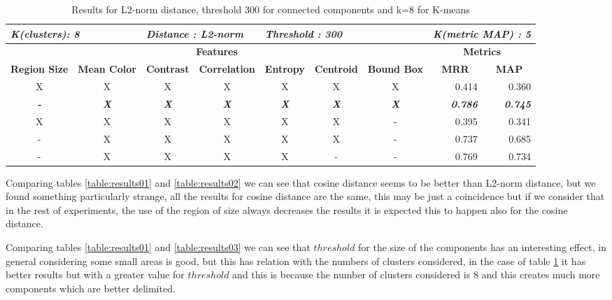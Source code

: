 \begin{table}[H]
\centering
\begin{tabular}{|c|c|c|c|c|c|c|r|r|}
\hline
\multicolumn{2}{|l|}{\textit{\textbf{K(clusters): 8}}} & \multicolumn{2}{l|}{\textit{\textbf{Distance : L2-norm}}} & \multicolumn{3}{l|}{\textit{\textbf{Threshold : 300}}} & \multicolumn{2}{l|}{\textit{\textbf{K(metric MAP) :  5}}} \\ \hline
\multicolumn{7}{|c|}{\textbf{Features}} & \multicolumn{2}{c|}{\textbf{Metrics}} \\ \hline
\textbf{Region Size} & \textbf{Mean Color} & \textbf{Contrast} & \textbf{Correlation} & \textbf{Entropy} & \textbf{Centroid} & \textbf{Bound Box} & \multicolumn{1}{c|}{\textbf{MRR}} & \multicolumn{1}{c|}{\textbf{MAP}} \\ \hline
X & X & X & X & X & X & X & 0.414 & 0.360 \\ \hline
\textit{\textbf{-}} & \textit{\textbf{X}} & \textit{\textbf{X}} & \textit{\textbf{X}} & \textit{\textbf{X}} & \textit{\textbf{X}} & \textit{\textbf{X}} & \textit{\textbf{0.786}} & \textit{\textbf{0.745}} \\ \hline
X & X & X & X & X & X & - & 0.395 & 0.341 \\ \hline
- & X & X & X & X & X & - & 0.737 & 0.685 \\ \hline
- & X & X & X & X & - & - & 0.769 & 0.734 \\ \hline
\end{tabular}
\caption{Results for L2-norm distance, threshold 300 for connected components and k=8 for K-means}
\label{table:results04}
\end{table}

Comparing tables \ref{table:results01} and \ref{table:results02} we can see that cosine distance seems to be better than L2-norm distance, but we found something particularly strange, all the results for cosine distance are the same, this may be just a coincidence but if we consider that in the rest of experiments, the use of the region of size always decreases the results it is expected this to happen also for the cosine distance.

Comparing tables \ref{table:results01} and \ref{table:results03} we can see that $threshold$ for the size of the components has an interesting effect, in general considering some small areas is good, but this has relation with the numbers of clusters considered, in the case of table \ref{table:results04} it has better results but with a greater value for $threshold$ and this is because the number of clusters considered is 8 and this creates much more components which are better delimited.

